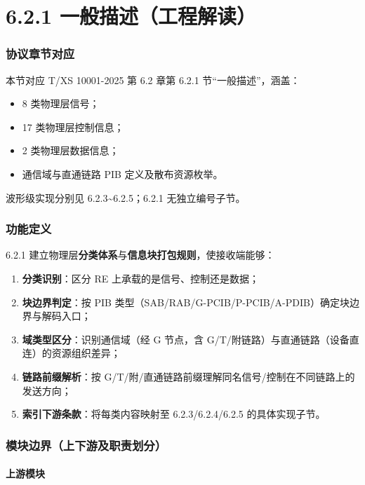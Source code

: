 \documentclass[11pt,a4paper]{ctexart}
\begin{document}
\newpage
\part{6.2.1 一般描述（工程解读）}

\section{协议章节对应}

本节对应 T/XS 10001-2025 第 6.2 章第 6.2.1 节``一般描述''，涵盖：
\begin{itemize}[nosep]
  \item 8 类物理层信号；
  \item 17 类物理层控制信息；
  \item 2 类物理层数据信息；
  \item 通信域与直通链路 PIB 定义及散布资源枚举。
\end{itemize}
波形级实现分别见 6.2.3\textasciitilde 6.2.5；6.2.1 无独立编号子节。

\section{功能定义}

6.2.1 建立物理层\textbf{分类体系}与\textbf{信息块打包规则}，使接收端能够：
\begin{enumerate}[nosep]
  \item \textbf{分类识别}：区分 RE 上承载的是信号、控制还是数据；
  \item \textbf{块边界判定}：按 PIB 类型（SAB/RAB/G-PCIB/P-PCIB/A-PDIB）确定块边界与解码入口；
  \item \textbf{域类型区分}：识别通信域（经 G 节点，含 G/T/附链路）与直通链路（设备直连）的资源组织差异；
  \item \textbf{链路前缀解析}：按 G/T/附/直通链路前缀理解同名信号/控制在不同链路上的发送方向；
  \item \textbf{索引下游条款}：将每类内容映射至 6.2.3/6.2.4/6.2.5 的具体实现子节。
\end{enumerate}

\section{模块边界（上下游及职责划分）}

\subsection{上游模块}
\end{document}
